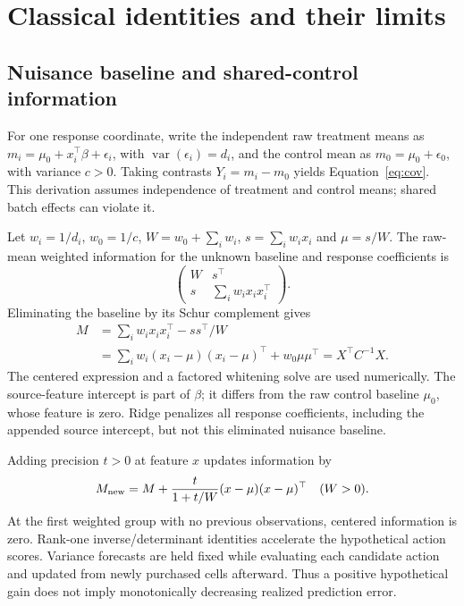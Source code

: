 \section{Classical identities and their limits}
\label{app:math}
\subsection{Nuisance baseline and shared-control information}
For one response coordinate, write the independent raw treatment means as $m_i=\mu_0+x_i^\top\beta+\epsilon_i$, with $\operatorname{var}(\epsilon_i)=d_i$, and the control mean as $m_0=\mu_0+\epsilon_0$, with variance $c>0$. Taking contrasts $Y_i=m_i-m_0$ yields Equation~\ref{eq:cov}. This derivation assumes independence of treatment and control means; shared batch effects can violate it.

Let $w_i=1/d_i$, $w_0=1/c$, $W=w_0+\sum_iw_i$, $s=\sum_iw_ix_i$ and $\mu=s/W$. The raw-mean weighted information for the unknown baseline and response coefficients is
\begin{equation}
 \begin{pmatrix}W&s^\top\\s&\sum_iw_ix_ix_i^\top\end{pmatrix}.
\end{equation}
Eliminating the baseline by its Schur complement gives
\begin{align}
 M&=\sum_iw_ix_ix_i^\top-ss^\top/W\\
  &=\sum_iw_i(x_i-\mu)(x_i-\mu)^\top+w_0\mu\mu^\top=X^\top C^{-1}X.
\end{align}
The centered expression and a factored whitening solve are used numerically. The source-feature intercept is part of $\beta$; it differs from the raw control baseline $\mu_0$, whose feature is zero. Ridge penalizes all response coefficients, including the appended source intercept, but not this eliminated nuisance baseline.

Adding precision $t>0$ at feature $x$ updates information by
\begin{equation}
 M_{\rm new}=M+\frac{t}{1+t/W}(x-\mu)(x-\mu)^\top \quad(W>0).
\end{equation}
At the first weighted group with no previous observations, centered information is zero. Rank-one inverse/determinant identities accelerate the hypothetical action scores. Variance forecasts are held fixed while evaluating each candidate action and updated from newly purchased cells afterward. Thus a positive hypothetical gain does not imply monotonically decreasing realized prediction error.

